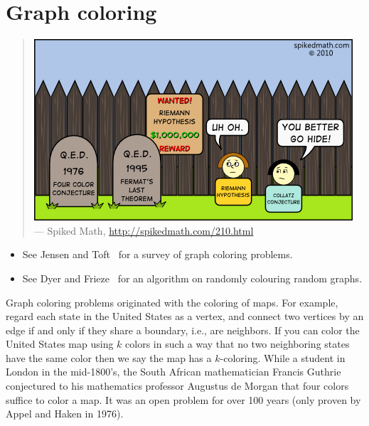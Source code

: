 
\chapter{Graph coloring}
\label{chap:graph_coloring}

\begin{quote}
\includegraphics[scale=1.0]{image/graph-coloring/four-color-conjecture-qed} \\
\noindent
--- Spiked Math,
\url{http://spikedmath.com/210.html}
\end{quote}

\begin{itemize}
\item See Jensen and Toft~\cite{JensenToft1995} for a survey of graph
  coloring problems.

\item See Dyer and Frieze~\cite{DyerFrieze2010} for an algorithm on
  randomly colouring random graphs.
\end{itemize}


Graph coloring problems originated with the coloring of maps. 
For example, regard each state in the United States as a vertex, 
and connect two vertices by an edge if and only if they share
a boundary, i.e., are neighbors. If you can color the United States 
map using $k$ colors in such a way that no two neighboring states have the 
same color then we say the map has a $k$-coloring. 
While a student in London in the mid-1800's, the South African mathematician
Francis Guthrie conjectured to his mathematics professor 
Augustus de Morgan that four colors suffice to color a map. 
It was an open problem for over 100 years (only proven by Appel
and Haken in 1976).


